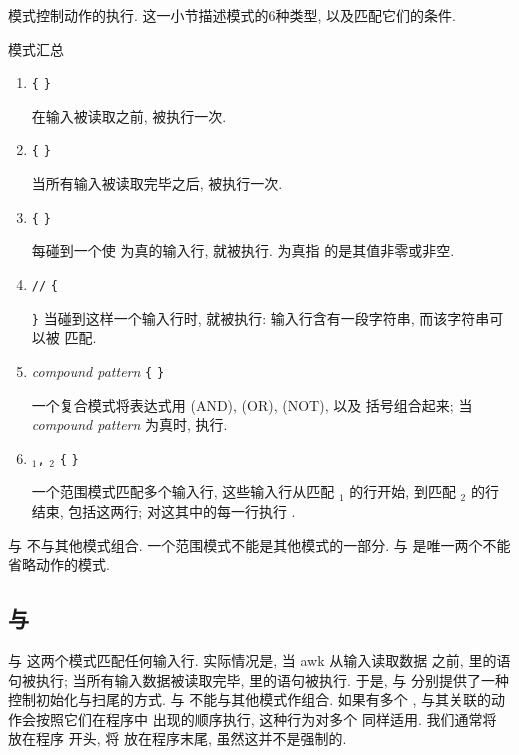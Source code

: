 模式控制动作的执行. 这一小节描述模式的6种类型, 以及匹配它们的条件.
\begin{summary}{模式汇总}
    \begin{enumerate}
        \item \BEGIN \verb'{' \stmt \verb'}' \par
            在输入被读取之前, \stmt 被执行一次.
        \item \END \verb'{' \stmt \verb'}'      \par
            当所有输入被读取完毕之后, \stmt 被执行一次.
        \item \expr \verb'{' \stmt \verb'}' \par
            每碰到一个使 \expr 为真的输入行, \stmt 就被执行. \expr 为真指
            的是其值非零或非空.
        \item \verb'/'\regexpr\verb'/' \verb'{' \par
            \stmt \verb'}'
            当碰到这样一个输入行时, \stmt 就被执行: 输入行含有一段字符串,
            而该字符串可以被 \regexpr 匹配.
        \item \textit{compound pattern} \verb'{' \stmt \verb'}' \par
            一个复合模式将表达式用 \AND{}(AND), \OR{}(OR), \NOT{}(NOT), 以及
            括号组合起来; 当 \textit{compound pattern} 为真时, \stmt 执行.
        \item \pat$_1$\verb',' \pat$_2$ \verb'{' \stmt{}\verb'}' \par
            一个范围模式匹配多个输入行, 这些输入行从匹配 \pat$_1$ 的行开始,
            到匹配 \pat$_2$ 的行结束, 包括这两行; 对这其中的每一行执行
            \stmt.
    \end{enumerate}
    \BEGIN 与 \END 不与其他模式组合. 一个范围模式不能是其他模式的一部分.
    \BEGIN 与 \END 是唯一两个不能省略动作的模式.
\end{summary}

\subsection{\BEGIN 与 \END}
\label{subsec:begin_and_end}

\BEGIN 与 \END 这两个模式匹配任何输入行. 实际情况是, 当 awk 从输入读取数据
之前, \BEGIN 里的语句被执行; 当所有输入数据被读取完毕, \END 里的语句被执行.
于是, \BEGIN 与 \END 分别提供了一种控制初始化与扫尾的方式. \BEGIN 与 \END
不能与其他模式作组合. 如果有多个 \BEGIN, 与其关联的动作会按照它们在程序中
出现的顺序执行, 这种行为对多个 \END 同样适用. 我们通常将 \BEGIN 放在程序
开头, 将 \END 放在程序末尾, 虽然这并不是强制的.

